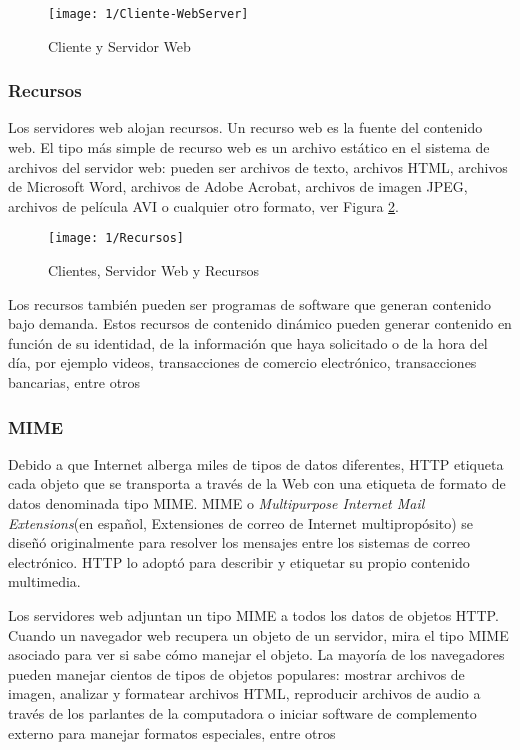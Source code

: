 	\begin{figure} %
		\texttt{[image: 1/Cliente-WebServer]}
		\caption{Cliente y Servidor Web}
		\label{fig:CSweb}
	\end{figure}
	
	
	\subsubsection{Recursos}   
	Los servidores web alojan \gls{recursos}. Un recurso web es la fuente del contenido web. El tipo más simple de recurso web es un archivo estático en el sistema de archivos del servidor web: pueden ser archivos de texto, archivos HTML, archivos de Microsoft Word, archivos de Adobe Acrobat, archivos de imagen JPEG, archivos de película AVI o cualquier otro formato, ver Figura \ref{fig:CS-Recursos}.
	
		\begin{figure} [h] %
		\texttt{[image: 1/Recursos]}
		\caption{Clientes, Servidor Web y Recursos }
		\label{fig:CS-Recursos}
	\end{figure}

	Los recursos también pueden ser programas de software que generan contenido bajo demanda. Estos recursos de contenido dinámico pueden generar contenido en función de su identidad, de la información que haya solicitado o de la hora del día, por ejemplo videos, transacciones de comercio electrónico, transacciones bancarias, entre otros
	

	
	\subsubsection{MIME}  
	Debido a que Internet alberga  miles de tipos de datos diferentes, HTTP etiqueta  cada objeto que se transporta a través de la Web con una etiqueta de formato de datos denominada tipo MIME. \gls{MIME} o \textit{Multipurpose Internet Mail Extensions}(en español, Extensiones de correo de Internet multipropósito) se diseñó originalmente para resolver los mensajes entre los sistemas de correo electrónico. HTTP lo adoptó para describir y etiquetar su propio contenido multimedia.
	
	Los servidores web adjuntan un tipo MIME a todos los datos de objetos HTTP. Cuando un navegador web recupera un objeto de un servidor, mira el tipo MIME asociado para ver si sabe cómo manejar el objeto. La mayoría de los navegadores pueden manejar cientos de tipos de objetos populares: mostrar archivos de imagen, analizar y formatear archivos HTML, reproducir archivos de audio a través de los parlantes de la computadora o iniciar software de complemento externo para manejar formatos especiales, entre otros
	
